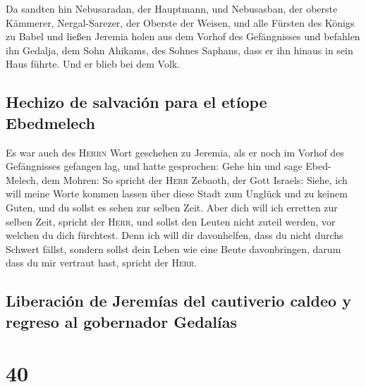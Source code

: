  Da sandten hin Nebusaradan, der Hauptmann, und
Nebusasban, der oberste Kämmerer, Nergal-Sarezer, der Oberste der
Weisen, und alle Fürsten des Königs zu Babel  und ließen
Jeremia holen aus dem Vorhof des Gefängnisses und befahlen ihn Gedalja,
dem Sohn Ahikams, des Sohnes Saphans, dass er ihn hinaus in sein Haus
führte. Und er blieb bei dem Volk.

\hypertarget{hechizo-de-salvaciuxf3n-para-el-etuxedope-ebedmelech}{%
\subsection{Hechizo de salvación para el etíope
Ebedmelech}\label{hechizo-de-salvaciuxf3n-para-el-etuxedope-ebedmelech}}

 Es war auch des \textsc{Herrn} Wort geschehen zu
Jeremia, als er noch im Vorhof des Gefängnisses gefangen lag, und hatte
gesprochen:  Gehe hin und sage Ebed-Melech, dem Mohren:
So spricht der \textsc{Herr} Zebaoth, der Gott Israels: Siehe, ich will
meine Worte kommen lassen über diese Stadt zum Unglück und zu keinem
Guten, und du sollst es sehen zur selben Zeit.  Aber dich
will ich erretten zur selben Zeit, spricht der \textsc{Herr}, und sollst
den Leuten nicht zuteil werden, vor welchen du dich fürchtest.
 Denn ich will dir davonhelfen, dass du nicht durchs
Schwert fällst, sondern sollst dein Leben wie eine Beute davonbringen,
darum dass du mir vertraut hast, spricht der \textsc{Herr}.

\hypertarget{liberaciuxf3n-de-jeremuxedas-del-cautiverio-caldeo-y-regreso-al-gobernador-gedaluxedas}{%
\subsection{Liberación de Jeremías del cautiverio caldeo y regreso al
gobernador
Gedalías}\label{liberaciuxf3n-de-jeremuxedas-del-cautiverio-caldeo-y-regreso-al-gobernador-gedaluxedas}}

\hypertarget{section-39}{%
\section{40}\label{section-39}}

